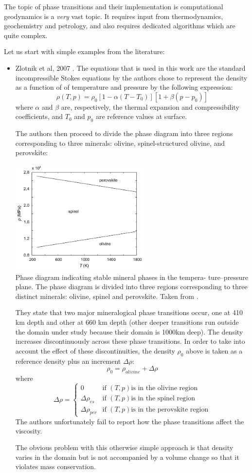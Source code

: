 
The topic of phase transitions and their implementation is computational geodynamics is a 
{\sl very} vast topic. It requires input from thermodynamics, geochemistry and petrology, and also requires 
dedicated algorithms which are quite complex.

Let us start with simple examples from the literature:

\begin{itemize}
\item Zlotnik et al, 2007 \cite{zldf07}. The equations that is used in this work are the 
standard incompressible Stokes equations by the authors chose to represent the 
density as a function of of temperature and pressure by the following expression:
\[
\rho(T,p)=\rho_0[1-\alpha(T-T_0)][1+\beta(p-p_0)]
\]
where $\alpha$ and $\beta$ are, respectively, the thermal expansion and
compressibility coefficients, and $T_0$ and $p_0$ are reference values at surface.

The authors then proceed to divide the phase diagram into three regions corresponding 
to three minerals: olivine, spinel-structured olivine, and perovskite:

\begin{center}
\includegraphics[width=7cm]{images/phasetransitions/zldf07}\\
{\captionfont Phase diagram indicating stable mineral phases in the tempera-
ture–pressure plane. The phase diagram is divided into three regions
corresponding to three distinct minerals: olivine, spinel and perovskite.
Taken from \cite{zldf07}.}
\end{center}

They state that two major mineralogical phase transitions occur, one at
410 km depth and other at 660 km depth (other deeper transitions run outside the 
domain under study because their domain is 1000km deep). The density increases 
discontinuously across these phase transitions. 
In order to take into account the effect of these 
discontinuities, the density $\rho_0$ above is taken as a reference density plus an 
increment $\Delta \rho$:
\[
\rho_0 = \rho_{olivine} + \Delta \rho
\]
where 
\[
\Delta \rho
=
\left\{
\begin{array}{lll}
0 & \text{if } (T,p) \text{is in the olivine region} \\
\Delta \rho_{es} & \text{if } (T,p) \text{is in the spinel region} \\
\Delta \rho_{per} & \text{if } (T,p) \text{is in the perovskite region} 
\end{array}
\right.
\]
The authors unfortunately fail to report how the phase transitions affect the viscosity.

The obvious problem with this otherwise simple approach is that density varies in the domain but 
is not accompanied by a volume change so that it violates mass conservation.

\end{itemize}
